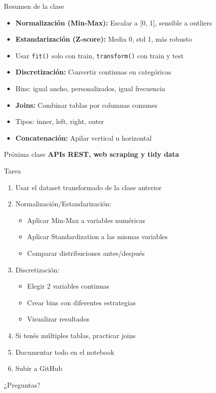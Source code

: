 \documentclass[aspectratio=169]{beamer}
\begin{document}
\begin{frame}{Resumen de la clase}
\begin{itemize}
    \item \textbf{Normalización (Min-Max):} Escalar a [0, 1], sensible a outliers
    \item \textbf{Estandarización (Z-score):} Media 0, std 1, más robusto
    \item Usar \texttt{fit()} solo con train, \texttt{transform()} con train y test
    \item \textbf{Discretización:} Convertir continuas en categóricas
    \item Bins: igual ancho, personalizados, igual frecuencia
    \item \textbf{Joins:} Combinar tablas por columnas comunes
    \item Tipos: inner, left, right, outer
    \item \textbf{Concatenación:} Apilar vertical u horizontal
\end{itemize}

\vspace{1em}

\begin{block}{Próxima clase}
\textbf{APIs REST, web scraping y tidy data}
\end{block}
\end{frame}

\begin{frame}{Tarea}
\begin{enumerate}
    \item Usar el dataset transformado de la clase anterior
    \item Normalización/Estandarización:
    \begin{itemize}
        \item Aplicar Min-Max a variables numéricas
        \item Aplicar Standardization a las mismas variables
        \item Comparar distribuciones antes/después
    \end{itemize}
    \item Discretización:
    \begin{itemize}
        \item Elegir 2 variables continuas
        \item Crear bins con diferentes estrategias
        \item Visualizar resultados
    \end{itemize}
    \item Si tenés múltiples tablas, practicar joins
    \item Documentar todo en el notebook
    \item Subir a GitHub
\end{enumerate}
\end{frame}

\begin{frame}[standout]
\Huge ¿Preguntas?
\end{frame}
\end{document}
